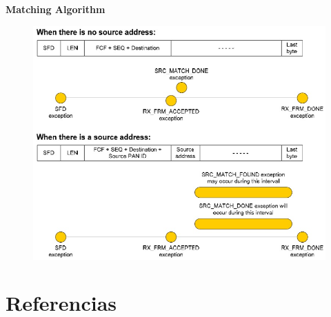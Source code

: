 \documentclass[aspectratio=169]{beamer}
\begin{document}
\begin{frame}{\textbf{Matching Algorithm}}
	\begin{figure}[H]
		\includegraphics[height=1\textheight]{./imagenes/matching.jpg}
	\end{figure}	
\end{frame}


\section{Referencias}
\end{document}
